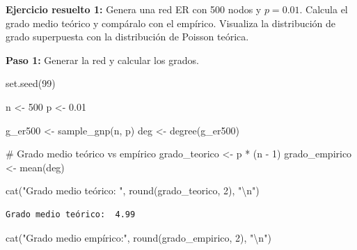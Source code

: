 \documentclass[
  letterpaper,
  DIV=11,
  numbers=noendperiod]{scrreprt}
\newenvironment{Shaded}{\begin{snugshade}}{\end{snugshade}}
\newcommand{\CommentTok}[1]{\textcolor[rgb]{0.37,0.37,0.37}{#1}}
\newcommand{\DecValTok}[1]{\textcolor[rgb]{0.68,0.00,0.00}{#1}}
\newcommand{\FloatTok}[1]{\textcolor[rgb]{0.68,0.00,0.00}{#1}}
\newcommand{\FunctionTok}[1]{\textcolor[rgb]{0.28,0.35,0.67}{#1}}
\newcommand{\NormalTok}[1]{\textcolor[rgb]{0.00,0.23,0.31}{#1}}
\newcommand{\OtherTok}[1]{\textcolor[rgb]{0.00,0.23,0.31}{#1}}
\newcommand{\SpecialCharTok}[1]{\textcolor[rgb]{0.37,0.37,0.37}{#1}}
\newcommand{\StringTok}[1]{\textcolor[rgb]{0.13,0.47,0.30}{#1}}
\begin{document}
\textbf{Ejercicio resuelto 1:} Genera una red ER con 500 nodos y
\(p = 0.01\). Calcula el grado medio teórico y compáralo con el
empírico. Visualiza la distribución de grado superpuesta con la
distribución de Poisson teórica.

\begin{tcolorbox}[enhanced jigsaw, toprule=.15mm, colframe=quarto-callout-tip-color-frame, coltitle=black, titlerule=0mm, colback=white, breakable, leftrule=.75mm, arc=.35mm, bottomtitle=1mm, toptitle=1mm, rightrule=.15mm, bottomrule=.15mm, left=2mm, title=\textcolor{quarto-callout-tip-color}{\faLightbulb}\hspace{0.5em}{📝 Solución}, colbacktitle=quarto-callout-tip-color!10!white, opacityback=0, opacitybacktitle=0.6]

\textbf{Paso 1:} Generar la red y calcular los grados.

\begin{Shaded}
\begin{Highlighting}[]
\FunctionTok{set.seed}\NormalTok{(}\DecValTok{99}\NormalTok{)}

\NormalTok{n }\OtherTok{\textless{}{-}} \DecValTok{500}
\NormalTok{p }\OtherTok{\textless{}{-}} \FloatTok{0.01}

\NormalTok{g\_er500 }\OtherTok{\textless{}{-}} \FunctionTok{sample\_gnp}\NormalTok{(n, p)}
\NormalTok{deg }\OtherTok{\textless{}{-}} \FunctionTok{degree}\NormalTok{(g\_er500)}

\CommentTok{\# Grado medio teórico vs empírico}
\NormalTok{grado\_teorico }\OtherTok{\textless{}{-}}\NormalTok{ p }\SpecialCharTok{*}\NormalTok{ (n }\SpecialCharTok{{-}} \DecValTok{1}\NormalTok{)}
\NormalTok{grado\_empirico }\OtherTok{\textless{}{-}} \FunctionTok{mean}\NormalTok{(deg)}

\FunctionTok{cat}\NormalTok{(}\StringTok{"Grado medio teórico: "}\NormalTok{, }\FunctionTok{round}\NormalTok{(grado\_teorico, }\DecValTok{2}\NormalTok{), }\StringTok{"}\SpecialCharTok{\textbackslash{}n}\StringTok{"}\NormalTok{)}
\end{Highlighting}
\end{Shaded}

\begin{verbatim}
Grado medio teórico:  4.99 
\end{verbatim}

\begin{Shaded}
\begin{Highlighting}[]
\FunctionTok{cat}\NormalTok{(}\StringTok{"Grado medio empírico:"}\NormalTok{, }\FunctionTok{round}\NormalTok{(grado\_empirico, }\DecValTok{2}\NormalTok{), }\StringTok{"}\SpecialCharTok{\textbackslash{}n}\StringTok{"}\NormalTok{)}
\end{Highlighting}
\end{Shaded}


\end{tcolorbox}
\end{document}
